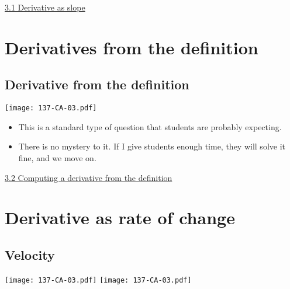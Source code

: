 \documentclass[11pt]{article}
\newcommand{\nl}{\hfill \vspace{-1.1\baselineskip}} %
\newcommand{\vi}{\hspace{8mm} \href{https://www.youtube.com/watch?v=7vhux5TLRmQ&list=PLlwePzQY_wW8qiZD6XYqCnibdY37ygbx7&index=1}{3.1 Derivative as slope}}
\newcommand{\vii}{\hspace{8mm} \href{https://www.youtube.com/watch?v=eNcg9cKzV1Q&list=PLlwePzQY_wW8qiZD6XYqCnibdY37ygbx7&index=2}{3.2 Computing a derivative from the definition}}
\begin{document}
\begin{videos}
\vi
\end{videos}

\newpage

\section{Derivatives from the definition} 

\subsection{Derivative from the definition} 

\begin{center}
{ \texttt{[image: 137-CA-03.pdf]}} 
\end{center}


\begin{comments}
\nl
	\begin{itemize}
		\item  This is a standard type of question that students are probably expecting.
		\item  There is no mystery to it.  If I give students enough time, they will solve it fine, and we move on.
	\end{itemize}	
\end{comments}

\begin{videos}
\vii
\end{videos}

\newpage

\section{Derivative as rate of change}

\subsection{Velocity} 

\begin{center}
{ \texttt{[image: 137-CA-03.pdf]}} \quad
{ \texttt{[image: 137-CA-03.pdf]}} 
\end{center}
\end{document}
